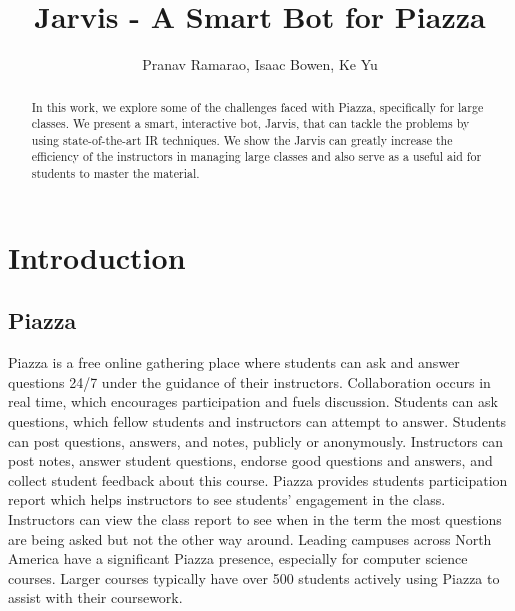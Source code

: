 \documentclass[sigconf]{acmart}
\begin{document}
\title{Jarvis - A Smart Bot for Piazza}
\author{Pranav Ramarao, Isaac Bowen, Ke Yu}


\renewcommand{\shortauthors}{Ramarao, Bowen, Yu}


\begin{abstract}
In this work, we explore some of the challenges faced with Piazza, specifically for large classes. We present a smart, interactive bot, Jarvis, that can tackle the problems by using state-of-the-art IR techniques. We show the Jarvis can greatly increase the efficiency of the instructors in managing large classes and also serve as a useful aid for students to master the material.
\end{abstract}


\maketitle
\section{Introduction}

\subsection{Piazza}
Piazza is a free online gathering place where students can ask and answer questions 24/7 under the guidance of their instructors. Collaboration occurs in real time, which encourages participation and fuels discussion. Students can ask questions, which fellow students and instructors can attempt to answer. Students can post questions, answers, and notes, publicly or anonymously. Instructors can post notes, answer student questions, endorse good questions and answers, and collect student feedback about this course. Piazza provides students participation report which helps instructors to see students’ engagement in the class. Instructors can view the class report to see when in the term the most questions are being asked but not the other way around. Leading campuses across North America have a significant Piazza presence, especially for computer science courses. Larger courses typically have over 500 students actively using Piazza to assist with their coursework.
\end{document}
